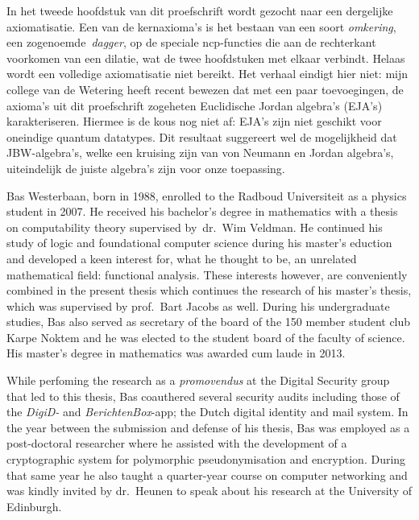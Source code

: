 In het tweede hoofdstuk van dit proefschrift
    wordt gezocht naar een dergelijke axiomatisatie.
        Een van de kernaxioma's is het bestaan
            van een soort \emph{omkering}, een zogenoemde~\emph{dagger},
            op de speciale ncp-functies die aan de rechterkant
            voorkomen van een dilatie,
            wat de twee hoofdstuken met elkaar verbindt.
Helaas wordt een volledige axiomatisatie niet bereikt.
Het verhaal eindigt hier niet:
    mijn college van de Wetering
        heeft recent bewezen dat met een paar toevoegingen,
        de axioma's uit dit proefschrift
        zogeheten Euclidische Jordan algebra's (EJA's) karakteriseren.
Hiermee is de kous nog niet af:
    EJA's zijn niet geschikt voor oneindige quantum datatypes.
Dit resultaat suggereert wel de mogelijkheid
    dat JBW-algebra's,
        welke een kruising zijn van von Neumann en Jordan algebra's,
    uiteindelijk de juiste algebra's zijn voor onze toepassing.


Bas Westerbaan, born in 1988,
    enrolled to the Radboud Universiteit
     as a physics student in 2007.
He received his bachelor's degree in
    mathematics with a thesis on computability theory
    supervised by~dr.~Wim Veldman.
He continued his study of logic and foundational computer science
    during his master's eduction and developed a keen interest for,
     what he thought to be, an unrelated mathematical field:
        functional analysis.
These interests however, are conveniently combined in the present thesis
    which continues the research of his master's thesis,
    which was supervised by prof.~Bart Jacobs as well.
During his undergraduate studies,
    Bas also served as secretary of the board of the 150 member student club
        Karpe Noktem and he was elected to
        the student board of the faculty of science.
His master's degree in mathematics was awarded cum laude in 2013.

While perfoming the research as a \emph{promovendus}
    at the Digital Security group that led to this thesis,
    Bas coauthered several security audits
        including those of the \emph{DigiD-} and \emph{BerichtenBox}-app;
        the Dutch digital identity and mail system. 
In the year between the submission and defense
    of his thesis, Bas was employed as a post-doctoral researcher
    where he assisted with the development of a cryptographic system
    for polymorphic pseudonymisation and encryption.
During that same year he also taught a quarter-year course on
    computer networking
        and was kindly invited by dr.~Heunen
        to speak about his research at the University of Edinburgh.

